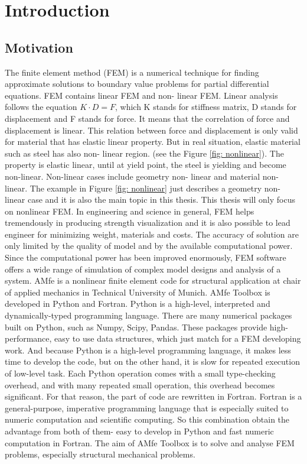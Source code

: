 \chapter{Introduction}



\section{Motivation} \label{sec:Einl:Motivation}
The finite element method (FEM) is a numerical technique for finding approximate solutions to boundary value problems for partial differential equations. FEM contains linear FEM and non- linear FEM. 
Linear analysis follows the equation $K\cdot D = F$, which K stands for stiffness matrix, D stands for  displacement and F stands for force. It means that the correlation of force and displacement is linear. This relation between force and displacement is only valid for material that has elastic linear property. But in real situation, elastic material such as steel has also non- linear region. (see the Figure \ref{fig: nonlinear}). The property is elastic linear,  until at yield point, the steel is yielding and become non-linear. Non-linear cases include geometry non- linear and material non- linear. The example in Figure \ref{fig: nonlinear} just describes a geometry non- linear case and it is also the main topic in this thesis. This thesis will only focus on nonlinear FEM. In engineering and science in general, FEM helps tremendously in producing strength visualization and it is also possible to lead engineer for minimizing weight, materials and costs. The accuracy of solution are only limited by the quality of model and by the available computational power.  Since the computational power has been improved enormously, FEM software offers a wide range of simulation of complex model designs and analysis of a system.  \newline
AMfe is a nonlinear finite element code for structural application at chair of applied mechanics in Technical University of Munich. AMfe Toolbox is developed in Python and Fortran. Python is a high-level, interpreted and dynamically-typed programming language.  There are many numerical packages built on Python, such as Numpy, Scipy, Pandas. These packages provide high-performance, easy to use data structures, which just match for a FEM developing work. And because Python is a high-level programming language, it makes less time to develop the code, but on the other hand, it is slow for repeated execution of low-level task. Each Python operation comes with a small type-checking overhead, and with many repeated small operation, this overhead becomes significant. For that reason, the part of code are rewritten in Fortran. Fortran is a general-purpose, imperative programming language that is especially suited to numeric computation and scientific computing. So this combination obtain the advantage from both of them- easy to develop in Python and fast numeric computation in Fortran. The aim of AMfe Toolbox is to solve and analyse FEM problems, especially structural mechanical problems.
